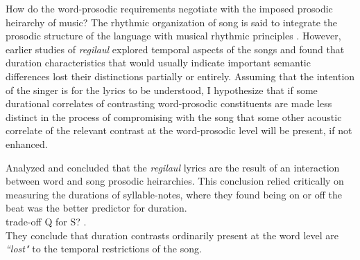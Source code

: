 
How do the word-prosodic requirements negotiate with the imposed prosodic heirarchy of music? The rhythmic organization of song is said to integrate the prosodic structure of the language with musical rhythmic principles \citep{palmerLinguisticProsodyMusical1992}. However, earlier studies of {\it regilaul} explored temporal aspects of the songs and found that duration characteristics that would usually indicate important semantic differences lost their distinctions partially or entirely. Assuming that the intention of the singer is for the lyrics to be understood, I hypothesize that if some durational correlates of contrasting word-prosodic constituents are made less distinct in the process of compromising with the song that some other acoustic correlate of the relevant contrast at the word-prosodic level will be present, if not enhanced.  


%






\citep{rossTimingEstonianFolk1998} Analyzed and concluded that the {\it regilaul} lyrics are the result of an interaction between word and song prosodic heirarchies. This conclusion relied critically on measuring the durations of syllable-notes, where they found being on or off the beat was the better predictor for duration. \\


trade-off Q for S? 
\citep{rossTradeoffQuantityStress1996}. \\
They conclude that duration contrasts ordinarily present at the word level are {\it ``lost"} \citep{rossLostProsodicOppositions1994} to the temporal restrictions of the song. 

